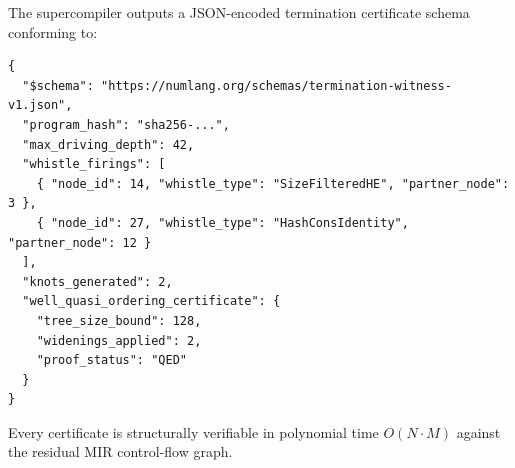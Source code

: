 The supercompiler outputs a JSON-encoded termination certificate schema conforming to:
\begin{lstlisting}[caption={JSON Schema for Supercompilation Termination Certificates.}]
{
  "$schema": "https://numlang.org/schemas/termination-witness-v1.json",
  "program_hash": "sha256-...",
  "max_driving_depth": 42,
  "whistle_firings": [
    { "node_id": 14, "whistle_type": "SizeFilteredHE", "partner_node": 3 },
    { "node_id": 27, "whistle_type": "HashConsIdentity", "partner_node": 12 }
  ],
  "knots_generated": 2,
  "well_quasi_ordering_certificate": {
    "tree_size_bound": 128,
    "widenings_applied": 2,
    "proof_status": "QED"
  }
}
\end{lstlisting}

Every certificate is structurally verifiable in polynomial time $O(N \cdot M)$ against the residual MIR control-flow graph.
